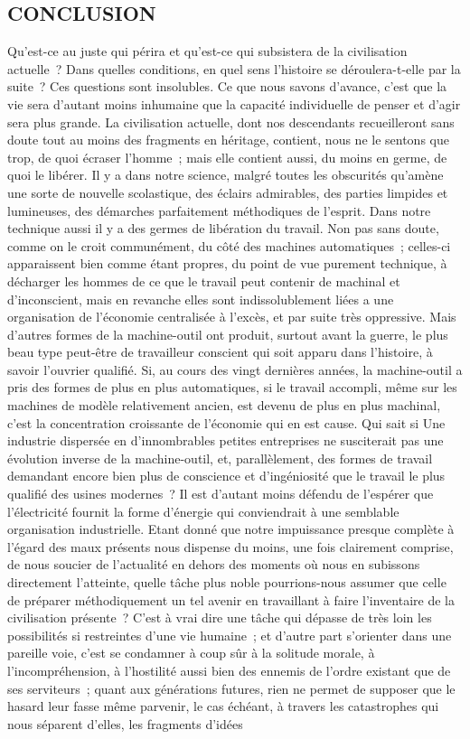 \documentclass[french,twoside]{book} %
\begin{document}
\subsection[CONCLUSION]{CONCLUSION}
\noindent Qu'est-ce au juste qui périra et qu'est-ce qui subsistera de la civilisation actuelle ? Dans quelles conditions, en quel sens l'histoire se déroulera-t-elle par la suite ? Ces questions sont insolubles. Ce que nous savons d'avance, c'est que la vie sera d'autant moins inhumaine que la capacité individuelle de penser et d'agir sera plus grande. La civilisation actuelle, dont nos descendants recueilleront sans doute tout au moins des fragments en héritage, contient, nous ne le sentons que trop, de quoi écraser l'homme ; mais elle contient aussi, du moins en germe, de quoi le libérer. Il y a dans notre science, malgré toutes les obscurités qu'amène une sorte de nouvelle scolastique, des éclairs admirables, des parties limpides et lumineuses, des démarches parfaitement méthodiques de l'esprit. Dans notre technique aussi il y a des germes de libération du travail. Non pas sans doute, comme on le croit communément, du côté des machines automatiques ; celles-ci apparaissent bien comme étant propres, du point de vue purement technique, à décharger les hommes de ce que le travail peut contenir de machinal et d'inconscient, mais en revanche elles sont indissolublement liées a une organisation de l'économie centralisée à l'excès, et par suite très oppressive. Mais d'autres formes de la machine-outil ont produit, surtout avant la guerre, le plus beau type peut-être de travailleur conscient qui soit apparu dans l'histoire, à savoir l'ouvrier qualifié. Si, au cours des vingt dernières années, la machine-outil a pris des formes de plus en plus automatiques, si le travail accompli, même sur les machines de modèle relativement ancien, est devenu de plus en plus machinal, c'est la concentration croissante de l'économie qui en est cause. Qui sait si Une industrie dispersée en d'innombrables petites entreprises ne susciterait pas une évolution inverse de la machine-outil, et, parallèlement, des formes de travail demandant encore bien plus de conscience et d'ingéniosité que le travail le plus qualifié des usines modernes ? Il est d'autant moins défendu de l'espérer que l'électricité fournit la forme d'énergie qui conviendrait à une semblable organisation industrielle. Etant donné que notre impuissance presque complète à l'égard des maux présents nous dispense du moins, une fois clairement comprise, de nous soucier de l'actualité en dehors des moments où nous en subissons directement l'atteinte, quelle tâche plus noble pourrions-nous assumer que celle de préparer méthodiquement un tel avenir en travaillant à faire l'inventaire de la civilisation présente ? C'est à vrai dire une tâche qui dépasse de très loin les possibilités si restreintes d'une vie humaine ; et d'autre part s'orienter dans une pareille voie, c'est se condamner à coup sûr à la solitude morale, à l'incompréhension, à l'hostilité aussi bien des ennemis de l'ordre existant que de ses serviteurs ; quant aux générations futures, rien ne permet de supposer que le hasard leur fasse même parvenir, le cas échéant, à travers les catastrophes qui nous séparent d'elles, les fragments d'idées 
\end{document}
